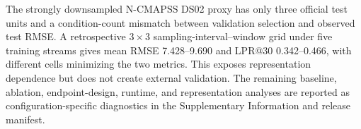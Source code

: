 The strongly downsampled N-CMAPSS DS02 proxy has only three official test units and a condition-count mismatch between validation selection and observed test RMSE. A retrospective $3\times3$ sampling-interval--window grid under five training streams gives mean RMSE 7.428--9.690 and LPR@30 0.342--0.466, with different cells minimizing the two metrics. This exposes representation dependence but does not create external validation. The remaining baseline, ablation, endpoint-design, runtime, and representation analyses are reported as configuration-specific diagnostics in the Supplementary Information and release manifest.
\FloatBarrier
